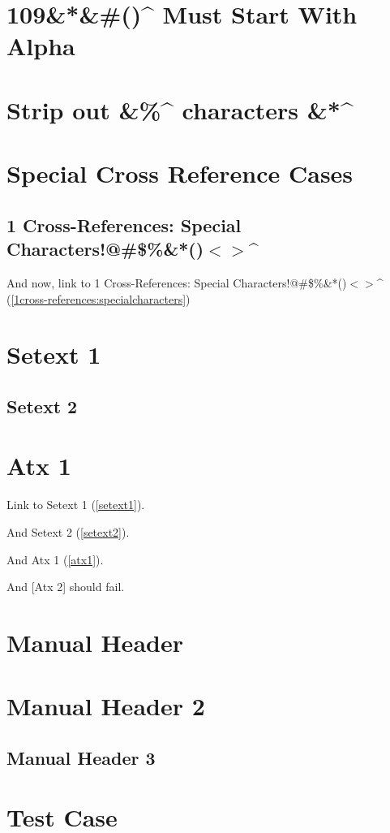 
\def\mytitle{MultiMarkdown Autoreference Test}


\chapter{109\&*\&\#()\^{} Must Start With Alpha}
\label{109muststartwithalpha}

\chapter{Strip out \&\%\^{} characters \&*\^{}}
\label{stripoutcharacters}

\chapter{Special Cross Reference Cases}
\label{specialcrossreferencecases}

\section{1 Cross-References: Special Characters!@\#\$\%\&*()$<$$>$\^{}}
\label{1cross-references:specialcharacters}

And now, link to 1 Cross-References: Special Characters!@\#\$\%\&*()$<$$>$\^{} (\autoref{1cross-references:specialcharacters})

\chapter{Setext 1}
\label{setext1}

\section{Setext 2}
\label{setext2}

\chapter{Atx 1}
\label{atx1}

Link to Setext 1 (\autoref{setext1}).

And Setext 2 (\autoref{setext2}).

And Atx 1 (\autoref{atx1}).

And [Atx 2] should fail.

\chapter{Manual Header}
\label{label}

\chapter{Manual Header 2}
\label{label2}

\section{Manual Header 3}
\label{label3}

\chapter{Test Case}
\label{test}




